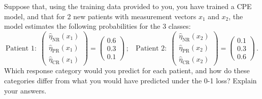 \begin{enumerate}
Suppose that, using the training data provided to you, you have trained a CPE model, and that for 2 new patients with measurement vectors $x_1$ and $x_2$, the model estimates the following probabilities for the 3 classes:
%
\[
\text{Patient 1:}~~ 
\left( \begin{array}{l}
	\hat{\eta}_{\text{NR}}(x_1) \\
	\hat{\eta}_{\text{PR}}(x_1) \\
	\hat{\eta}_{\text{CR}}(x_1) 
\end{array} \right)
	= 
\left( \begin{array}{l}
	0.6 \\
	0.3 \\
	0.1 
\end{array} \right)
	\,;
	~~~~
\text{Patient 2:}~~ 
\left( \begin{array}{l}
	\hat{\eta}_{\text{NR}}(x_2) \\
	\hat{\eta}_{\text{PR}}(x_2) \\
	\hat{\eta}_{\text{CR}}(x_2) 
\end{array} \right)
	= 
\left( \begin{array}{l}
	0.1 \\
	0.3 \\
	0.6 
\end{array} \right)
	\,.
\]	
Which response category would you predict for each patient, and how do these categories differ from what you would have predicted under the 0-1 loss? Explain your answers.	
\end{enumerate}
%